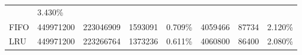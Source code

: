 \documentclass[11pt]{article}
\begin{document}
\begin{longtable}[]{@{}llllllll@{}}
\begin{minipage}[t]{0.10\columnwidth}
\end{minipage} & \begin{minipage}[t]{0.10\columnwidth}\raggedright\strut
3.430\%\strut
\end{minipage}\tabularnewline
\begin{minipage}[t]{0.14\columnwidth}\raggedright\strut
FIFO\strut
\end{minipage} & \begin{minipage}[t]{0.10\columnwidth}\raggedright\strut
449971200\strut
\end{minipage} & \begin{minipage}[t]{0.08\columnwidth}\raggedright\strut
223046909\strut
\end{minipage} & \begin{minipage}[t]{0.09\columnwidth}\raggedright\strut
1593091\strut
\end{minipage} & \begin{minipage}[t]{0.09\columnwidth}\raggedright\strut
0.709\%\strut
\end{minipage} & \begin{minipage}[t]{0.09\columnwidth}\raggedright\strut
4059466\strut
\end{minipage} & \begin{minipage}[t]{0.10\columnwidth}\raggedright\strut
87734\strut
\end{minipage} & \begin{minipage}[t]{0.10\columnwidth}\raggedright\strut
2.120\%\strut
\end{minipage}\tabularnewline
\begin{minipage}[t]{0.14\columnwidth}\raggedright\strut
LRU\strut
\end{minipage} & \begin{minipage}[t]{0.10\columnwidth}\raggedright\strut
449971200\strut
\end{minipage} & \begin{minipage}[t]{0.08\columnwidth}\raggedright\strut
223266764\strut
\end{minipage} & \begin{minipage}[t]{0.09\columnwidth}\raggedright\strut
1373236\strut
\end{minipage} & \begin{minipage}[t]{0.09\columnwidth}\raggedright\strut
0.611\%\strut
\end{minipage} & \begin{minipage}[t]{0.09\columnwidth}\raggedright\strut
4060800\strut
\end{minipage} & \begin{minipage}[t]{0.10\columnwidth}\raggedright\strut
86400\strut
\end{minipage} & \begin{minipage}[t]{0.10\columnwidth}\raggedright\strut
2.080\%\strut
\end{minipage}\tabularnewline
\bottomrule
\end{longtable}
\end{document}
